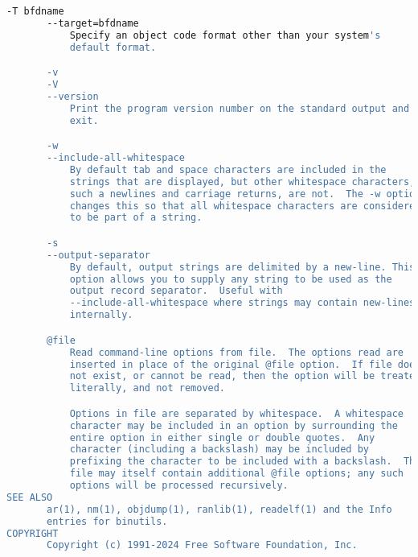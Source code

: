 {{\begin{lstlisting}[language=bash]
       -T bfdname
       --target=bfdname
           Specify an object code format other than your system's
           default format.

       -v
       -V
       --version
           Print the program version number on the standard output and
           exit.

       -w
       --include-all-whitespace
           By default tab and space characters are included in the
           strings that are displayed, but other whitespace characters,
           such a newlines and carriage returns, are not.  The -w option
           changes this so that all whitespace characters are considered
           to be part of a string.

       -s
       --output-separator
           By default, output strings are delimited by a new-line. This
           option allows you to supply any string to be used as the
           output record separator.  Useful with
           --include-all-whitespace where strings may contain new-lines
           internally.

       @file
           Read command-line options from file.  The options read are
           inserted in place of the original @file option.  If file does
           not exist, or cannot be read, then the option will be treated
           literally, and not removed.

           Options in file are separated by whitespace.  A whitespace
           character may be included in an option by surrounding the
           entire option in either single or double quotes.  Any
           character (including a backslash) may be included by
           prefixing the character to be included with a backslash.  The
           file may itself contain additional @file options; any such
           options will be processed recursively.
SEE ALSO
       ar(1), nm(1), objdump(1), ranlib(1), readelf(1) and the Info
       entries for binutils.
COPYRIGHT
       Copyright (c) 1991-2024 Free Software Foundation, Inc.


\end{lstlisting}}}
